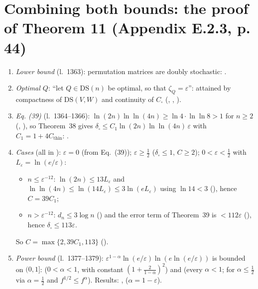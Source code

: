 \section{Combining both bounds: the proof of Theorem 11 (Appendix E.2.3, p. 44)}
\begin{enumerate}
\item \emph{Lower bound} (l.~1363): permutation matrices are doubly stochastic: .
\item \emph{Optimal $Q$}: ``let $Q\in\mathrm{DS}(n)$ be optimal, so that $\zeta_Q=\varepsilon$'': attained by compactness of
$\mathrm{DS}(V,W)$ and continuity of $C_\square$ (, ,
).
\item \emph{Eq. (39)} (l.~1364--1366): $\ln(2n)\ln\ln(4n)\ge\ln4\cdot\ln\ln8>1$ for $n\ge2$
(, ), so Theorem~38 gives
$\delta_\square\le C_1\ln(2n)\ln\ln(4n)\,\varepsilon$ with $C_1=1+4C_{\mathrm{thin}}$: .
\item \emph{Cases} (all in ): $\varepsilon=0$ (from Eq.~(39)); $\varepsilon\ge\frac12$ ($\delta_\square\le1$, $C\ge2$);
$0<\varepsilon<\frac12$ with $L_\varepsilon=\ln(e/\varepsilon)$:
  \begin{itemize}
  \item $n\le\varepsilon^{-12}$: $\ln(2n)\le13L_\varepsilon$ and $\ln\ln(4n)\le\ln(14L_\varepsilon)\le3\ln(eL_\varepsilon)$ using $\ln14<3$
  (), hence $C=39C_1$;
  \item $n>\varepsilon^{-12}$: $d_n\le3\log n$ () and the error term of Theorem~39 is $<112\varepsilon$
  (), hence $\delta_\square\le113\varepsilon$.
  \end{itemize}
  So $C=\max\{2,39C_1,113\}$ ().
\item \emph{Power bound} (l.~1377--1379): $\varepsilon^{1-\alpha}\ln(e/\varepsilon)\ln(e\ln(e/\varepsilon))$ is bounded on $(0,1]$:
 ($0<\alpha<1$, with constant $(1+\frac2{1-\alpha})^2$) and  (every $\alpha<1$;
for $\alpha\le\frac12$ via $\alpha=\frac12$ and $f^{1/2}\le f^\alpha$). Results: ,
 ($\alpha=1-\varepsilon$).
\end{enumerate}

